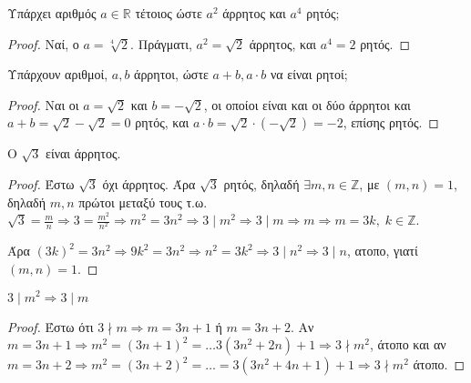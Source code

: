 \documentclass[main.tex]{subfiles}
\begin{document}
\begin{example}
    Υπάρχει αριθμός $ a \in \mathbb{R} $ τέτοιος ώστε $ a^{2} $ άρρητος και $ a^{4} $ 
    ρητός; 
\end{example}

\begin{proof}
    Ναί, ο $ a= \sqrt[4]{2} $. Πράγματι, $ a^{2} = \sqrt{2} $ άρρητος, και $ 
    a^{4} = 2$ ρητός.
\end{proof}

\begin{example}
    Υπάρχουν αριθμοί, $ a,b $ άρρητοι, ώστε $ a+b, a\cdot b $ να είναι ρητοί;
\end{example}

\begin{proof}
    Ναι οι $ a= \sqrt{2} $ και $ b= - \sqrt{2} $, οι οποίοι είναι και οι δύο άρρητοι 
    και $ a+b= \sqrt{2} - \sqrt{2} = 0 $ ρητός, και $ a\cdot b = \sqrt{2} \cdot (- 
    \sqrt{2}) = -2 $, επίσης ρητός.
\end{proof}

\begin{example}
    Ο $ \sqrt{3} $ είναι άρρητος.
\end{example}

\begin{proof}
    Έστω $ \sqrt{3} $ όχι άρρητος. Άρα $ \sqrt{3} $ ρητός, δηλαδή $ \exists m,n 
    \in \mathbb{Z} $, με $ (m,n)=1 $, δηλαδή $ m,n $ πρώτοι μεταξύ τους
    τ.ω. $ \sqrt{3} = \frac{m}{n} \Rightarrow 3 = \frac{m^{2}}{n^{2}} \Rightarrow 
    m^{2} = 3n^{2} \Rightarrow 3 \mid m^{2} \Rightarrow 3 \mid m  \Rightarrow m 
    \Rightarrow m = 3k, \; k \in \mathbb{Z}$. 

    Άρα $ (3k)^{2} = 3n^{2} \Rightarrow 9k^{2}=3n^{2} \Rightarrow n^{2} = 3k^{2} 
    \Rightarrow 3 \mid n^{2} \Rightarrow  3 \mid n$,  ατοπο, γιατί $ (m,n)=1 $.
\end{proof}

\begin{lem}
    $ 3 \mid m^{2} \Rightarrow 3 \mid m $
\end{lem}
 
\begin{proof}
    Έστω ότι $ 3 \nmid m \Rightarrow m = 3n +1 $ ή $ m = 3n+2 $. 
    Αν $ m=3n+1 \Rightarrow m^{2} = (3n+1)^{2} = \ldots 3(3n^{2}+2n)+1 \Rightarrow 
    3 \nmid m^{2}$, άτοπο και αν $ m =3n+2 \Rightarrow m^{2}=(3n+2)^{2} = \ldots = 
    3(3n^{2}+4n+1)+1 \Rightarrow 3 \nmid m^{2}$ άτοπο.
\end{proof}
\end{document}
